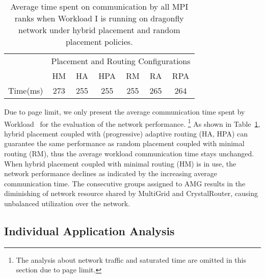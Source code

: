 \begin{table}[ht]
\begin{center}
\caption{Average time spent on communication by all MPI ranks when Workload I is running on dragonfly network under hybrid placement and random placement policies.} 
\label{tab: hyb-placement-wkld-commtime}
\begin{tabular}{l c c c c c c }
\toprule %
\toprule
&\multicolumn{6}{c}{Placement and Routing Configurations} \\
\cmidrule(l){2-7}
          & HM & HA & HPA & RM & RA & RPA \\ %
\midrule %
Time(ms)  &273 &255 &255 &255 &265 &264  \\ %
\midrule %
\bottomrule %
\end{tabular}
\end{center}
\end{table}

Due to page limit, we only present the average communication time spent by Workload~ for the evaluation of the network performance.
\footnote{The analysis about network traffic and saturated time are omitted in this section due to page limit.}
As shown in Table~\ref{tab: hyb-placement-wkld-commtime}, 
hybrid placement coupled with (progressive) adaptive routing (HA, HPA) can guarantee the same performance as random placement coupled with minimal routing (RM), thus the average workload communication time stays unchanged. 
When hybrid placement coupled with minimal routing (HM) is in use, 
the network performance declines  as indicated by the increasing average communication time. 
The consecutive groups assigned to AMG results in the diminishing of network resource shared by MultiGrid and CrystalRouter, 
causing unbalanced utilization over the network.  



\subsection{Individual Application Analysis}

